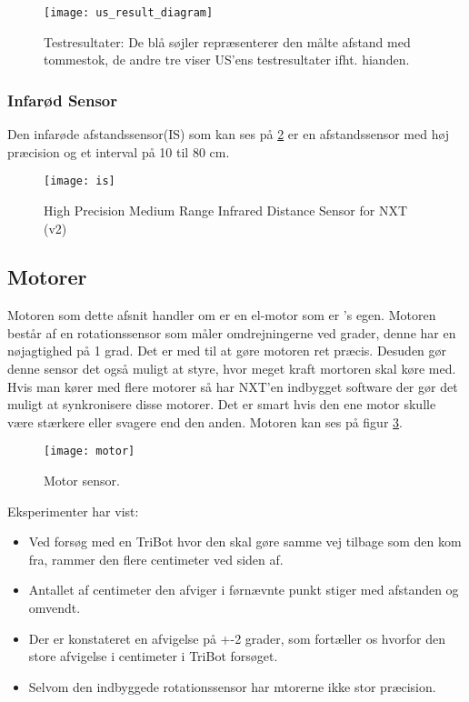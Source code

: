 \begin{figure}[h]
\centering
\texttt{[image: us\_result\_diagram]}
\caption{Testresultater: De blå søjler repræsenterer den målte afstand med tommestok, de andre tre viser US'ens testresultater ifht. hianden.}
\label{sensor:ultrasonic_resultat_diagram}
\end{figure}


\subsubsection{Infarød Sensor}
Den infarøde afstandssensor(IS) som kan ses på \ref{sensor:infraroed_sensor} er en afstandssensor med høj præcision og et interval på 10 til 80 cm.

\begin{figure}[h]
\centering
\texttt{[image: is]} 	
\caption{High Precision Medium Range Infrared Distance Sensor for NXT (v2)}
\label{sensor:infraroed_sensor}
\end{figure}

\subsection{Motorer}
Motoren som dette afsnit handler om er en el-motor som er \lego's egen.
Motoren består af en rotationssensor som måler omdrejningerne ved grader, denne har en nøjagtighed på 1 grad. Det er med til at gøre motoren ret præcis. 
Desuden gør denne sensor det også muligt at styre, hvor meget kraft mortoren skal køre med.
Hvis man kører med flere motorer så har NXT'en indbygget software der gør det muligt at synkronisere disse motorer.
Det er smart hvis den ene motor skulle være stærkere eller svagere end den anden.\cite{tikNXT}
Motoren kan ses på figur \ref{sensor:motor_sensor}.
\\

\begin{figure}[h]
\centering
\texttt{[image: motor]} 	
\caption{Motor sensor.}
\label{sensor:motor_sensor}
\end{figure}

Eksperimenter\cite{tikNXT} har vist:
\begin{itemize}
\item Ved forsøg med en TriBot hvor den skal gøre samme vej tilbage som den kom fra, rammer den flere centimeter ved siden af.
\item Antallet af centimeter den afviger i førnævnte punkt stiger med afstanden og omvendt.
\item Der er konstateret en afvigelse på +-2 grader, som fortæller os hvorfor den store afvigelse i centimeter i TriBot forsøget.
\item Selvom den indbyggede rotationssensor har mtorerne ikke stor præcision.
\end{itemize}

